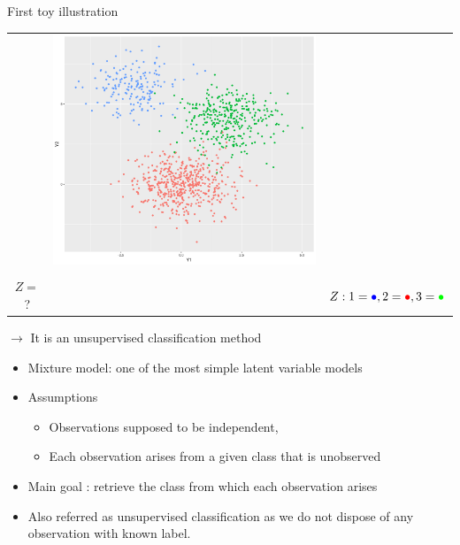 \documentclass[compress,10pt]{beamer}
\begin{document}
\begin{frame}{First  toy illustration}
\begin{tabular}{c|c|c}
  & \includegraphics[scale=0.13]{bivariategaussianmixtureLabelled}\\
 &  & \\
  $Z =$ ? &
  & $Z: 1 = \textcolor{blue}{\bf \bullet}, 2 = \textcolor{red}{\bf \bullet}, 3 = \textcolor{green}{\bf \bullet}$ \\
\end{tabular} 

\vspace{1em}

\centerline{$\rightarrow$ It is an unsupervised classification method}
\end{frame}

\begin{frame}

\begin{itemize}
 \item Mixture model:  one of the most simple latent variable models
 \item \textcolor{dgreen}{Assumptions}
 \begin{itemize}
 \item Observations supposed to be independent, 
 \item Each  observation arises from a given class that is \textcolor{dgreen}{unobserved}
\end{itemize}
\item \textcolor{dgreen}{Main goal} : retrieve the class from which each observation arises
\item Also referred as  \textcolor{dgreen}{unsupervised classification} as we do not dispose of any observation with known label.
\end{itemize}
 
\end{frame}
\end{document}
